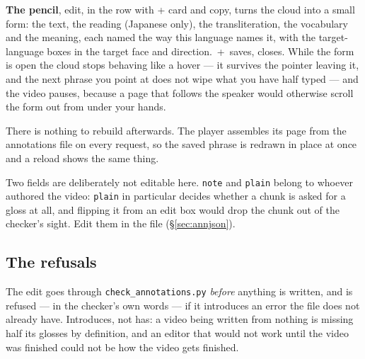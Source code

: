 \documentclass[11pt,oneside]{report}
\newcommand{\file}[1]{\texttt{#1}}
\newcommand{\key}[1]{\textsf{\small\fbox{#1}}}
\newcommand{\menu}[1]{\textsf{#1}}
\begin{document}
\textbf{The pencil}, \menu{edit}, in the row with \menu{+ card} and
\menu{copy}, turns the cloud into a small form: the text, the reading
(Japanese only), the transliteration, the vocabulary and the meaning, each
named the way this language names it, with the target-language boxes in the
target face and direction. \key{Ctrl}\,+\,\key{$\hookleftarrow$} saves, \key{Esc} closes.
While the form is open the cloud stops behaving like a hover --- it survives
the pointer leaving it, and the next phrase you point at does not wipe what
you have half typed --- and the video pauses, because a page that follows the
speaker would otherwise scroll the form out from under your hands.

There is nothing to rebuild afterwards. The player assembles its page from
the annotations file on every request, so the saved phrase is redrawn in
place at once and a reload shows the same thing.

Two fields are deliberately not editable here. \texttt{note} and
\texttt{plain} belong to whoever authored the video: \texttt{plain} in
particular decides whether a chunk is asked for a gloss at all, and flipping
it from an edit box would drop the chunk out of the checker's sight. Edit them
in the file (\S\ref{sec:annjson}).

\subsection*{The refusals}

The edit goes through \file{check\_annotations.py} \emph{before} anything is
written, and is refused --- in the checker's own words --- if it introduces an
error the file does not already have. Introduces, not has: a video being
written from nothing is missing half its glosses by definition, and an editor
that would not work until the video was finished could not be how the video
gets finished.
\end{document}
